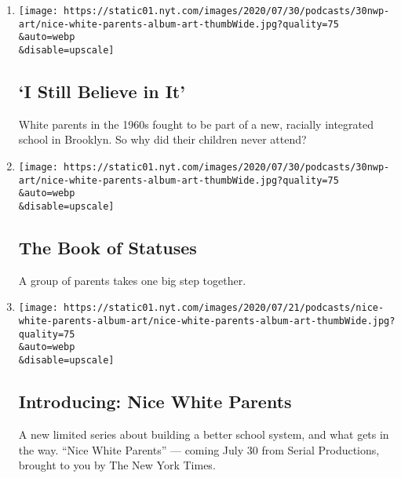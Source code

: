 \begin{enumerate}
\def\labelenumi{\arabic{enumi}.}
\item
  \href{/2020/07/30/podcasts/nice-white-parents-serial-2.html}{}

  \texttt{[image: https://static01.nyt.com/images/2020/07/30/podcasts/30nwp-art/nice-white-parents-album-art-thumbWide.jpg?quality=75\\\&auto=webp\\\&disable=upscale]}

  \hypertarget{i-still-believe-in-it}{%
  \subsection{`I Still Believe in It'}\label{i-still-believe-in-it}}

  White parents in the 1960s fought to be part of a new, racially
  integrated school in Brooklyn. So why did their children never attend?
\item
  \href{/2020/07/30/podcasts/nice-white-parents-serial.html}{}

  \texttt{[image: https://static01.nyt.com/images/2020/07/30/podcasts/30nwp-art/nice-white-parents-album-art-thumbWide.jpg?quality=75\\\&auto=webp\\\&disable=upscale]}

  \hypertarget{the-book-of-statuses}{%
  \subsection{The Book of Statuses}\label{the-book-of-statuses}}

  A group of parents takes one big step together.
\item
  \href{/2020/07/23/podcasts/nice-white-parents-serial.html}{}

  \texttt{[image: https://static01.nyt.com/images/2020/07/21/podcasts/nice-white-parents-album-art/nice-white-parents-album-art-thumbWide.jpg?quality=75\\\&auto=webp\\\&disable=upscale]}

  \hypertarget{introducing-nice-white-parents}{%
  \subsection{Introducing: Nice White
  Parents}\label{introducing-nice-white-parents}}

  A new limited series about building a better school system, and what
  gets in the way. ``Nice White Parents'' --- coming July 30 from Serial
  Productions, brought to you by The New York Times.
\end{enumerate}

